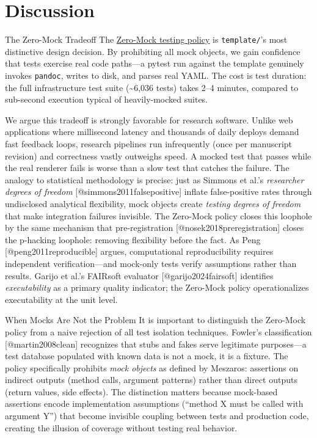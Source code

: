 \documentclass[
  ignorenonframetext,
]{beamer}
\author{\texorpdfstring{}{}}
\date{}
\begin{document}
\section{Discussion}\label{discussion}

\begin{frame}[fragile]{The Zero-Mock Tradeoff}
\protect{}\label{the-zero-mock-tradeoff}
The \href{03e_quality.md\#zero-mock-testing-policy}{Zero-Mock testing
policy} is \texttt{template/}'s most distinctive design decision. By
prohibiting all mock objects, we gain confidence that tests exercise
real code paths---a pytest run against the template genuinely invokes
\texttt{pandoc}, writes to disk, and parses real YAML. The cost is test
duration: the full infrastructure test suite (\textasciitilde6,036
tests) takes 2--4 minutes, compared to sub-second execution typical of
heavily-mocked suites.

We argue this tradeoff is strongly favorable for research software.
Unlike web applications where millisecond latency and thousands of daily
deploys demand fast feedback loops, research pipelines run infrequently
(once per manuscript revision) and correctness vastly outweighs speed. A
mocked test that passes while the real renderer fails is worse than a
slow test that catches the failure. The analogy to statistical
methodology is precise: just as Simmons et al.'s \emph{researcher
degrees of freedom} {[}@simmons2011falsepositive{]} inflate
false-positive rates through undisclosed analytical flexibility, mock
objects create \emph{testing degrees of freedom} that make integration
failures invisible. The Zero-Mock policy closes this loophole by the
same mechanism that pre-registration {[}@nosek2018preregistration{]}
closes the p-hacking loophole: removing flexibility before the fact. As
Peng {[}@peng2011reproducible{]} argues, computational reproducibility
requires independent verification---and mock-only tests verify
assumptions rather than results. Garijo et al.'s FAIRsoft evaluator
{[}@garijo2024fairsoft{]} identifies \emph{executability} as a primary
quality indicator; the Zero-Mock policy operationalizes executability at
the unit level.

\begin{block}{When Mocks Are Not the Problem}
\protect{}\label{when-mocks-are-not-the-problem}
It is important to distinguish the Zero-Mock policy from a naive
rejection of all test isolation techniques. Fowler's classification
{[}@martin2008clean{]} recognizes that stubs and fakes serve legitimate
purposes---a test database populated with known data is not a mock, it
is a fixture. The policy specifically prohibits \emph{mock objects} as
defined by Meszaros: assertions on indirect outputs (method calls,
argument patterns) rather than direct outputs (return values, side
effects). The distinction matters because mock-based assertions encode
implementation assumptions (``method X must be called with argument Y'')
that become invisible coupling between tests and production code,
creating the illusion of coverage without testing real behavior.
\end{block}


\end{frame}
\end{document}
